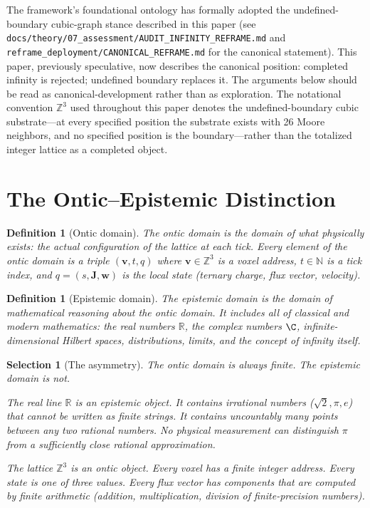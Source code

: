 \documentclass[11pt]{article}
\theoremstyle{tight}
\theoremstyle{plainroman}
\newtheorem{selection}[theorem]{Selection}
\newtheorem{definition}[theorem]{Definition}
\newcommand{\R}{\mathbb{R}}
\newcommand{\Z}{\mathbb{Z}}
\newcommand{\N}{\mathbb{N}}
\begin{document}
The framework's foundational ontology has formally adopted the undefined-boundary cubic-graph stance described in this paper (see \texttt{docs/theory/07\_assessment/AUDIT\_INFINITY\_REFRAME.md} and \texttt{reframe\_deployment/CANONICAL\_REFRAME.md} for the canonical statement). This paper, previously speculative, now describes the canonical position: completed infinity is rejected; undefined boundary replaces it. The arguments below should be read as canonical-development rather than as exploration. The notational convention $\Z^3$ used throughout this paper denotes the undefined-boundary cubic substrate---at every specified position the substrate exists with 26 Moore neighbors, and no specified position is the boundary---rather than the totalized integer lattice as a completed object.

\clearpage

\section{The Ontic--Epistemic Distinction}

\begin{definition}[Ontic domain]
The \emph{ontic domain} is the domain of what physically exists: the actual configuration of the lattice at each tick.
Every element of the ontic domain is a triple $(\mathbf v, t, q)$ where $\mathbf v\in\Z^3$ is a voxel address, $t\in\N$ is a tick index, and $q=(s,\mathbf J,\mathbf w)$ is the local state (ternary charge, flux vector, velocity).
\end{definition}

\begin{definition}[Epistemic domain]
The \emph{epistemic domain} is the domain of mathematical reasoning about the ontic domain.
It includes all of classical and modern mathematics: the real numbers $\R$, the complex numbers $\C$, infinite-dimensional Hilbert spaces, distributions, limits, and the concept of infinity itself.
\end{definition}

\begin{selection}[The asymmetry]
The ontic domain is always finite.
The epistemic domain is not.

The real line $\R$ is an epistemic object.
It contains irrational numbers ($\sqrt{2},\pi,e$) that cannot be written as finite strings.
It contains uncountably many points between any two rational numbers.
No physical measurement can distinguish $\pi$ from a sufficiently close rational approximation.

The lattice $\Z^3$ is an ontic object.
Every voxel has a finite integer address.
Every state is one of three values.
Every flux vector has components that are computed by finite arithmetic (addition, multiplication, division of finite-precision numbers).
\end{selection}
\end{document}
